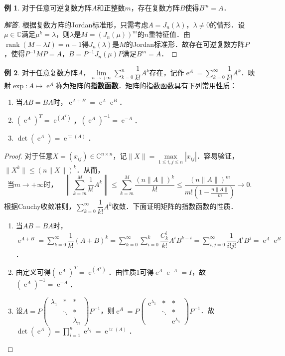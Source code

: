 \documentclass[a4paper,fontset=windows]{ctexbook}
\theoremstyle{definition}
\newtheorem{example}{例}[chapter]
\DeclareMathOperator{\E}{e}
\DeclareMathOperator{\rank}{rank}
\DeclareMathOperator{\tr}{tr}
\renewcommand{\le}{\leqslant}
\begin{document}
\begin{example}\label{ex5.10}
对于任意可逆复数方阵$A$和正整数$m$，存在复数方阵$B$使得$B^m=A$．
\end{example}

\begin{proof}[解答]
根据复数方阵的Jordan标准形，只需考虑$A=J_n(\lambda)$，$\lambda\ne 0$的情形．设$\mu\in\mathbb{C}$满足$\mu^k=\lambda$，则$\lambda$是$M=(J_n(\mu))^m$的$n$重特征值．由$\rank(M-\lambda I)=n-1$得$J_n(\lambda)$是$M$的Jordan标准形．故存在可逆复数方阵$P$，使得$P^{-1}MP=A$，$B=P^{-1}J_n(\mu)P$满足$B^m=A$．
\end{proof}

\begin{example}
对于任意复数方阵$A$，$\lim\limits_{n\to+\infty}\sum\limits_{k=0}^n\dfrac{1}{k!}A^k$存在，记作$\E^A=\sum\limits_{k=0}^\infty\dfrac{1}{k!}A^k$．映射$\exp:A\mapsto\E^A$称为矩阵的{\bf 指数函数}．矩阵的指数函数具有下列常用性质：
\begin{enumerate}
\item 当$AB=BA$时，$\E^{A+B}=\E^A\E^B$．
\item $(\E^A)^T=\E^{(A^T)}$，$(\E^A)^{-1}=\E^{-A}$．
\item $\det(\E^A)=\E^{\tr(A)}$．
\end{enumerate}
\end{example}

\begin{proof}
对于任意$X=(x_{ij})\in\mathbb{C}^{n\times n}$，记$\|X\|=\max\limits_{1\le i,j\le n}|x_{ij}|$．容易验证，$\|X^k\|\le(n\|X\|)^k$．从而，
$$\text{当$m\to+\infty$时，}\quad\left\|\sum_{k=m}^M\frac{1}{k!}A^k\right\|\le\sum_{k=m}^M\frac{(n\|A\|)^k}{k!}\le\frac{(n\|A\|)^m}{m!(1-\frac{n\|A\|}{m})}\to 0.$$
根据Cauchy收敛准则，$\sum\limits_{k=0}^\infty\dfrac{1}{k!}A^k$收敛．下面证明矩阵的指数函数的性质．
\begin{enumerate}
\item 当$AB=BA$时，$\E^{A+B}=\sum\limits_{k=0}^\infty\dfrac{1}{k!}(A+B)^k=\sum\limits_{k=0}^\infty\sum\limits_{i=0}^k\dfrac{C_k^i}{k!}A^iB^{k-i}=\sum\limits_{i,j=0}^\infty\dfrac{1}{i!j!}A^iB^j=\E^A\E^B$．

\item 由定义可得$(\E^A)^T=\E^{(A^T)}$．由性质1可得$\E^A\E^{-A}=I$，故$(\E^A)^{-1}=\E^{-A}$．

\item 设$A=P\begin{pmatrix}\lambda_1&*&* \\ &\ddots&* \\ &&\lambda_n\end{pmatrix}P^{-1}$，则$\E^A=P\begin{pmatrix}\E^{\lambda_1}&*&* \\ &\ddots&* \\ &&\E^{\lambda_n}\end{pmatrix}P^{-1}$．故$\det(\E^A)=\prod\limits_{i=1}^n\E^{\lambda_i}=\E^{\tr(A)}$．\qedhere
\end{enumerate}
\end{proof}
\end{document}
